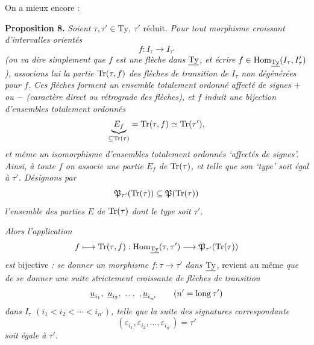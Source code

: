 On a mieux encore :

\textbf{Proposition 8.} \textit{Soient $\tau, \tau' \in \mathrm{Ty}$, $\tau'$} réduit. \textit{Pour tout morphisme croissant d'intervalles orientés}
\[
f : I_\tau \longrightarrow I_{\tau'}
\]
\textit{(on va dire simplement que $f$ est une flèche dans $\underline{\mathrm{Ty}}$, et écrire $f \in \mathrm{Hom}_{\underline{\mathrm{Ty}}}(I_\tau, I'_\tau)$), associons lui la partie $\mathrm{Tr}(\tau, f)$ des flèches de transition de $I_\tau$ non dégénérées pour $f$. Ces flèches forment un ensemble totalement ordonné affecté de signes $+$ ou $-$ (caractère direct ou rétrograde des flèches), et $f$ induit une bijection d'ensembles totalement ordonnés} %
\[
\underbrace{E_f}_{\subseteq \mathrm{Tr}(\tau)} = \mathrm{Tr}(\tau, f) \simeq \mathrm{Tr}(\tau'),
\]
\textit{et même un isomorphisme d'ensembles totalement ordonnés ‘affectés de signes’. Ainsi, à toute $f$ on associe une partie $E_f$ de $\mathrm{Tr}(\tau)$, et telle que son ‘type’ soit égal à $\tau'$. Désignons par}
\[
\mathfrak{P}_{\tau'}(\mathrm{Tr}(\tau)) \subseteq \mathfrak{P}(\mathrm{Tr}(\tau))
\]
\textit{l'ensemble des parties $E$ de $\mathrm{Tr}(\tau)$ dont le type soit $\tau'$.}

\textit{Alors l'application}
\[
f \longmapsto \mathrm{Tr}(\tau, f) : \mathrm{Hom}_{\underline{\mathrm{Ty}}}(\tau, \tau') \longrightarrow \mathfrak{P}_{\tau'}(\mathrm{Tr}(\tau))
\]
\textit{est} bijective \textit{: se donner un morphisme $f : \tau \longrightarrow \tau'$ dans $\underline{\mathrm{Ty}}$,} revient au même \textit{que de se donner une suite strictement croissante de flèches de transition}
\[
\underline{u}_{i_1},\ \underline{u}_{i_2},\ \dots\ ,\underline{u}_{i_{n'}} \qquad (n' = \lng \tau')
\]
\textit{dans $I_\tau$ $(i_1 < i_2 < \cdots < i_{n'})$, telle que la suite des signatures correspondante}
\[
(\varepsilon_{i_1}, \varepsilon_{i_2}, \dots, \varepsilon_{i_{n'}}) = \tau'
\]
\textit{soit égale à $\tau'$.}

